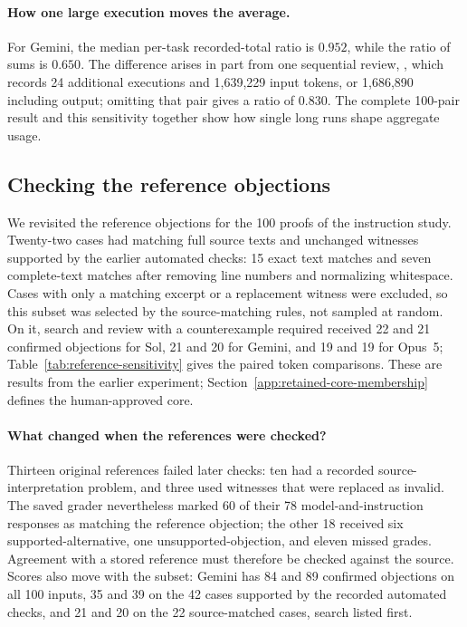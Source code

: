 \paragraph{How one large execution moves the average.}
For Gemini, the median per-task recorded-total ratio is $0.952$, while the ratio of sums is $0.650$. The difference arises in part from one sequential review, , which records 24 additional executions and 1,639,229 input tokens, or 1,686,890 including output; omitting that pair gives a ratio of $0.830$. The complete 100-pair result and this sensitivity together show how single long runs shape aggregate usage.

\subsection{Checking the reference objections}
\label{app:reference-reconciliation}
We revisited the reference objections for the 100 proofs of the instruction study. Twenty-two cases had matching full source texts and unchanged witnesses supported by the earlier automated checks: 15 exact text matches and seven complete-text matches after removing line numbers and normalizing whitespace. Cases with only a matching excerpt or a replacement witness were excluded, so this subset was selected by the source-matching rules, not sampled at random. On it, search and review with a counterexample required received 22 and 21 confirmed objections for Sol, 21 and 20 for Gemini, and 19 and 19 for Opus~5; Table~\ref{tab:reference-sensitivity} gives the paired token comparisons. These are results from the earlier experiment; Section~\ref{app:retained-core-membership} defines the human-approved core.

\begin{table}[!htbp]
\centering
\caption{The 22 source-matched cases from the instruction study. Counts compare search with sequential review with a counterexample required, under the common September grades. Ratios compare accepted solver-attempt token sums. Intervals use the paired 20,000-resample analysis described in Section~\ref{app:primary-witness-accounting}.}
\label{tab:reference-sensitivity}
\small
\setlength{\tabcolsep}{4pt}

\end{table}

\paragraph{What changed when the references were checked?}
Thirteen original references failed later checks: ten had a recorded source-interpretation problem, and three used witnesses that were replaced as invalid. The saved grader nevertheless marked 60 of their 78 model-and-instruction responses as matching the reference objection; the other 18 received six supported-alternative, one unsupported-objection, and eleven missed grades. Agreement with a stored reference must therefore be checked against the source. Scores also move with the subset: Gemini has 84 and 89 confirmed objections on all 100 inputs, 35 and 39 on the 42 cases supported by the recorded automated checks, and 21 and 20 on the 22 source-matched cases, search listed first.

